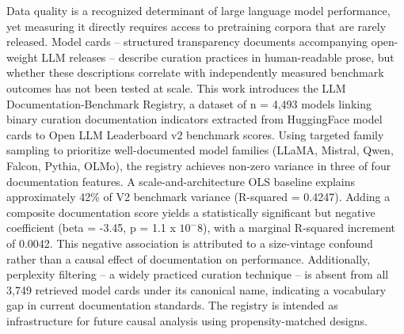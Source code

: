 
Data quality is a recognized determinant of large language model performance, yet measuring it directly requires access to pretraining corpora that are rarely released. Model cards -- structured transparency documents accompanying open-weight LLM releases -- describe curation practices in human-readable prose, but whether these descriptions correlate with independently measured benchmark outcomes has not been tested at scale. This work introduces the LLM Documentation-Benchmark Registry, a dataset of n = 4,493 models linking binary curation documentation indicators extracted from HuggingFace model cards to Open LLM Leaderboard v2 benchmark scores. Using targeted family sampling to prioritize well-documented model families (LLaMA, Mistral, Qwen, Falcon, Pythia, OLMo), the registry achieves non-zero variance in three of four documentation features. A scale-and-architecture OLS baseline explains approximately 42\% of V2 benchmark variance (R-squared = 0.4247). Adding a composite documentation score yields a statistically significant but negative coefficient (beta = -3.45, p = 1.1 x $10^-8$), with a marginal R-squared increment of 0.0042. This negative association is attributed to a size-vintage confound rather than a causal effect of documentation on performance. Additionally, perplexity filtering -- a widely practiced curation technique -- is absent from all 3,749 retrieved model cards under its canonical name, indicating a vocabulary gap in current documentation standards. The registry is intended as infrastructure for future causal analysis using propensity-matched designs.
